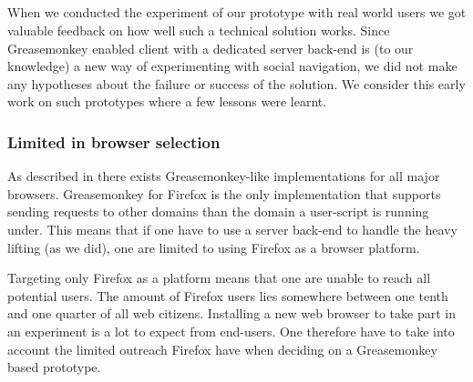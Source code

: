 \subsection{%
}

When we conducted the experiment of our prototype with real world users
we got valuable feedback on how well such a technical solution works.
Since Greasemonkey enabled client with a dedicated server back-end is (to our
knowledge) a new way of experimenting with social navigation, we did not
make any hypotheses about the failure or success of the solution.
We consider this early work on such prototypes where a few lessons
were learnt.

\subsubsection{Limited in browser selection}

As described in
 there exists Greasemonkey-like
implementations for all major browsers. Greasemonkey for Firefox is the only
implementation that supports sending requests to other domains than the domain
a user-script is running under. This means that if one have to use a server
back-end to handle the heavy lifting (as we did), one are limited to
using Firefox as a browser platform.%

Targeting only Firefox as a platform means that one are unable to reach
all potential users. The amount of Firefox users lies somewhere
between one tenth and one quarter of all web citizens.%
Installing a new web browser to take part in an
experiment is a lot to expect from end-users. One therefore have to take into
account the limited outreach Firefox have when deciding on a Greasemonkey
based prototype.

